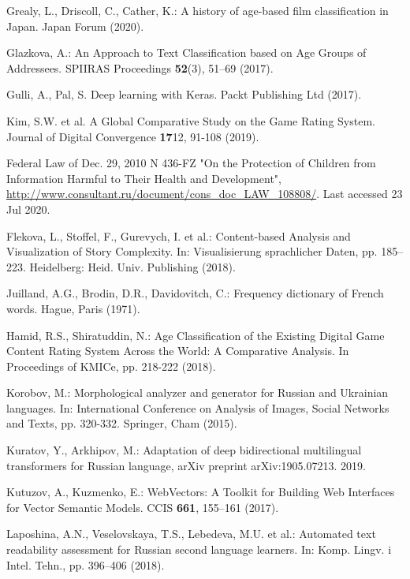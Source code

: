 \documentclass[runningheads]{llncs}
\begin{document}
\begin{thebibliography}{37}
Grealy, L., Driscoll, C., Cather, K.: A history of age-based
film classification in Japan. Japan Forum (2020). 

Glazkova, A.: An Approach to Text Classification based on Age Groups of Addressees. SPIIRAS Proceedings \textbf{52}(3), 51--69 (2017). 

Gulli, A., Pal, S. Deep learning with Keras. Packt Publishing Ltd (2017).

Kim, S.W. et al. A Global Comparative Study on the Game Rating System. Journal of Digital Convergence \textbf{17}12, 91-108 (2019).

Federal Law of Dec. 29, 2010 N 436-FZ "On the Protection of Children from Information Harmful to Their Health and Development", \url{http://www.consultant.ru/document/cons\_doc\_LAW\_108808/}. Last accessed 23 Jul 2020.

Flekova, L., Stoffel, F., Gurevych, I. et al.: Content-based Analysis and Visualization of Story Complexity. In:  Visualisierung
sprachlicher Daten, pp. 185--223. Heidelberg: Heid. Univ. Publishing (2018).

Juilland, A.G., Brodin, D.R., Davidovitch, C.: Frequency dictionary of French words. Hague, Paris (1971).

Hamid, R.S., Shiratuddin, N.: Age Classification of the Existing Digital Game Content Rating System Across the World: A Comparative Analysis. In Proceedings of KMICe, pp. 218-222 (2018).

Korobov, M.: Morphological analyzer and generator for Russian and Ukrainian languages. In: International Conference on Analysis of Images, Social Networks and Texts, pp. 320-332. Springer, Cham (2015). 

Kuratov, Y., Arkhipov, M.: Adaptation of deep bidirectional multilingual transformers for Russian language, arXiv preprint arXiv:1905.07213. 2019.

Kutuzov, A., Kuzmenko, E.: WebVectors: A Toolkit for Building Web Interfaces for Vector Semantic Models. CCIS \textbf{661}, 155--161 (2017). 

Laposhina, A.N., Veselovskaya, T.S., Lebedeva, M.U. et al.: Automated text readability assessment for Russian second language learners. In: Komp. Lingv. i Intel. Tehn., pp. 396--406 (2018).


\end{thebibliography}
\end{document}
